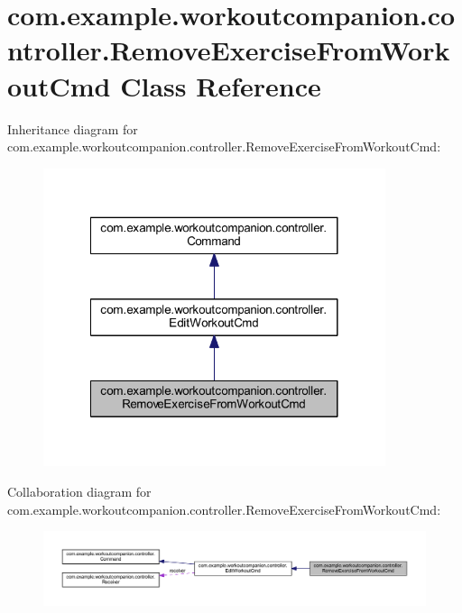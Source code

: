 \hypertarget{classcom_1_1example_1_1workoutcompanion_1_1controller_1_1_remove_exercise_from_workout_cmd}{\section{com.\-example.\-workoutcompanion.\-controller.\-Remove\-Exercise\-From\-Workout\-Cmd Class Reference}
\label{classcom_1_1example_1_1workoutcompanion_1_1controller_1_1_remove_exercise_from_workout_cmd}
}


Inheritance diagram for com.\-example.\-workoutcompanion.\-controller.\-Remove\-Exercise\-From\-Workout\-Cmd\-:
\nopagebreak
\begin{figure}[H]
\begin{center}
\leavevmode
\includegraphics[width=284pt]{classcom_1_1example_1_1workoutcompanion_1_1controller_1_1_remove_exercise_from_workout_cmd__inherit__graph}
\end{center}
\end{figure}


Collaboration diagram for com.\-example.\-workoutcompanion.\-controller.\-Remove\-Exercise\-From\-Workout\-Cmd\-:
\nopagebreak
\begin{figure}[H]
\begin{center}
\leavevmode
\includegraphics[width=350pt]{classcom_1_1example_1_1workoutcompanion_1_1controller_1_1_remove_exercise_from_workout_cmd__coll__graph}
\end{center}
\end{figure}
